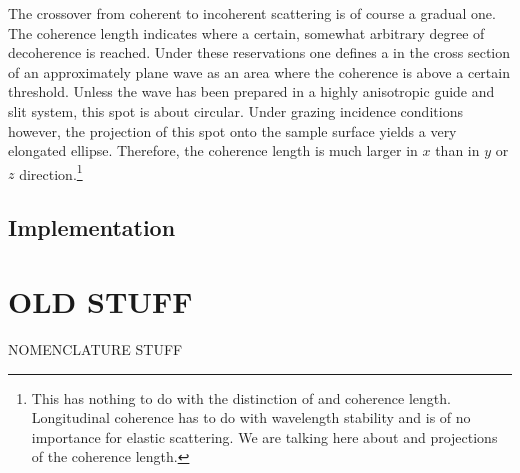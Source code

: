 The crossover from coherent to incoherent scattering is of course
a gradual one.
The coherence length indicates where a certain, somewhat arbitrary degree
of decoherence is reached.
Under these reservations
one defines a 
in the cross section of an approximately plane wave
as an area where the coherence is above a certain threshold.
Unless the wave has been prepared in a highly anisotropic guide and slit system,
this spot is about circular.
Under grazing incidence conditions however,
the projection of this spot onto the sample surface
yields a very elongated ellipse.
Therefore, the coherence length is much larger in $x$ than
in $y$ or $z$ direction.\footnote
{This has nothing to do with the distinction of
   and  coherence length.
  Longitudinal coherence has to do with wavelength stability
  and is of no importance for elastic scattering.
  We are talking here about  and 
  projections of the  coherence length.}

\subsection{Implementation}




%




\section{OLD STUFF}

NOMENCLATURE STUFF
%
%

